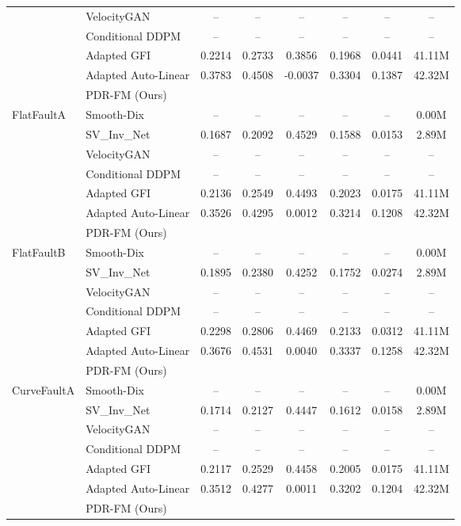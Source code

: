 \documentclass[letterpaper]{article}
\begin{document}
\begin{table}[t]
{\begin{tabular}{llcccccc}
 & VelocityGAN & -- & -- & -- & -- & -- & -- \\
 & Conditional DDPM & -- & -- & -- & -- & -- & -- \\
 & Adapted GFI & 0.2214 & 0.2733 & 0.3856 & 0.1968 & 0.0441 & 41.11M \\
 & Adapted Auto-Linear & 0.3783 & 0.4508 & -0.0037 & 0.3304 & 0.1387 & 42.32M \\
 & PDR-FM (Ours) &  &  &  &  &  &  \\
\hline
FlatFaultA & Smooth-Dix & -- & -- & -- & -- & -- & 0.00M \\
 & SV\_Inv\_Net & 0.1687 & 0.2092 & 0.4529 & 0.1588 & 0.0153 & 2.89M \\
 & VelocityGAN & -- & -- & -- & -- & -- & -- \\
 & Conditional DDPM & -- & -- & -- & -- & -- & -- \\
 & Adapted GFI & 0.2136 & 0.2549 & 0.4493 & 0.2023 & 0.0175 & 41.11M \\
 & Adapted Auto-Linear & 0.3526 & 0.4295 & 0.0012 & 0.3214 & 0.1208 & 42.32M \\
 & PDR-FM (Ours) &  &  &  &  &  &  \\
\hline
FlatFaultB & Smooth-Dix & -- & -- & -- & -- & -- & 0.00M \\
 & SV\_Inv\_Net & 0.1895 & 0.2380 & 0.4252 & 0.1752 & 0.0274 & 2.89M \\
 & VelocityGAN & -- & -- & -- & -- & -- & -- \\
 & Conditional DDPM & -- & -- & -- & -- & -- & -- \\
 & Adapted GFI & 0.2298 & 0.2806 & 0.4469 & 0.2133 & 0.0312 & 41.11M \\
 & Adapted Auto-Linear & 0.3676 & 0.4531 & 0.0040 & 0.3337 & 0.1258 & 42.32M \\
 & PDR-FM (Ours) &  &  &  &  &  &  \\
\hline
CurveFaultA & Smooth-Dix & -- & -- & -- & -- & -- & 0.00M \\
 & SV\_Inv\_Net & 0.1714 & 0.2127 & 0.4447 & 0.1612 & 0.0158 & 2.89M \\
 & VelocityGAN & -- & -- & -- & -- & -- & -- \\
 & Conditional DDPM & -- & -- & -- & -- & -- & -- \\
 & Adapted GFI & 0.2117 & 0.2529 & 0.4458 & 0.2005 & 0.0175 & 41.11M \\
 & Adapted Auto-Linear & 0.3512 & 0.4277 & 0.0011 & 0.3202 & 0.1204 & 42.32M \\
 & PDR-FM (Ours) &  &  &  &  &  &  \\

\end{tabular}}
\end{table}
\end{document}
